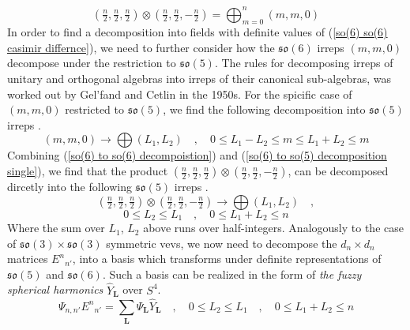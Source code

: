 %
%
\begin{equation}\label{so(6) to so(6) decompoistion}
(\tfrac{n}{2},\tfrac{n}{2},\tfrac{n}{2})
\otimes
(\tfrac{n}{2},\tfrac{n}{2},-\tfrac{n}{2})
=
\bigoplus_{m = 0}^{n}
(m,m,0)
\end{equation}
%
%
In order to find a decomposition into fields with definite values of (\ref{so(6) so(6) casimir differnce}), we need to further consider how the $\mathfrak{so}(6)$ irreps $(m,m,0)$ decompose under the restriction to $\mathfrak{so}(5)$. The rules for decomposing irreps of unitary and orthogonal algebras into irreps of their canonical sub-algebras, was worked out by Gel'fand and Cetlin in the 1950s. For the spicific case of $(m,m,0)$ restricted to $\mathfrak{so}(5)$, we find the following decomposition into $\mathfrak{so}(5)$ irreps \cite{Lie groups and Lie algebras}.
%
%
\begin{equation}\label{so(6) to so(5) decomposition single}
(m,m,0)
\to
\bigoplus
(L_1,L_2)
%
\quad , \quad
%
0 \leq L_1 - L_2 \leq m \leq L_1 + L_2 \leq m
\end{equation}
%
%
Combining (\ref{so(6) to so(6) decompoistion}) and (\ref{so(6) to so(5) decomposition single}), we find that the product $(\tfrac{n}{2},\tfrac{n}{2},\tfrac{n}{2}) \otimes (\tfrac{n}{2},\tfrac{n}{2},-\tfrac{n}{2})$, can be decomposed dircetly into the following $\mathfrak{so}(5)$ irreps \cite{One-point functions in D3-D7 SO(5)}.
%
%
\begin{equation*}
(\tfrac{n}{2},\tfrac{n}{2},\tfrac{n}{2})
\otimes
(\tfrac{n}{2},\tfrac{n}{2},-\tfrac{n}{2})
\to
\bigoplus
(L_1,L_2)
%
\quad ,
\end{equation*}
%
%
\begin{equation}\label{so(6) to so(5) decomposition combined}
0 \leq L_2 \leq L_1
%
\quad , \quad
%
0 \leq L_1 + L_2 \leq n
\end{equation}
%
%
Where the sum over $L_1$, $L_2$ above runs over half-integers. Analogously to the case of $\mathfrak{so}(3) \times \mathfrak{so}(3)$ symmetric vevs, we now need to decompose the $d_n \times d_n$ matrices ${E^n}_{n'}$, into a basis which transforms under definite representations of $\mathfrak{so}(5)$ and $\mathfrak{so}(6)$. Such a basis can be realized in the form of \textit{the fuzzy spherical harmonics} $\hat{Y}_{\mathbf{L}}$ over $S^4$.
%
%
\begin{equation}
\Psi_{n,n'} {E^{n}}_{n'}
=
\sum_{\mathbf{L}}
\Psi_{\mathbf{L}} \hat{Y}_{\mathbf{L}}
%
\quad , \quad
%
0 \leq L_2 \leq L_1
%
\quad , \quad
%
0 \leq L_1 + L_2 \leq n
\end{equation}
